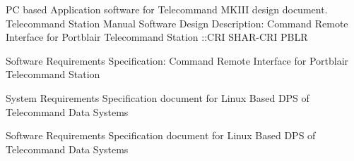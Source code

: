 \begin{thebibliography}{99}
 PC based Application software for Telecommand MKIII design document.
 Telecommand Station Manual
 Software Design Description: Command Remote Interface 
for Portblair Telecommand Station ::CRI SHAR-CRI PBLR

 Software Requirements Specification: Command Remote Interface for Portblair Telecommand Station

 System Requirements Specification document for Linux Based DPS of Telecommand Data Systems

 Software Requirements Specification document for Linux Based DPS of Telecommand Data Systems




\end{thebibliography}